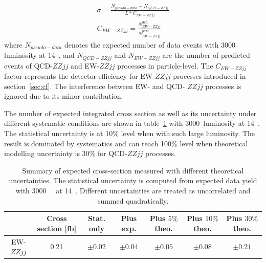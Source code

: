 \begin{equation}
\begin{split}
  \sigma = \frac{N_{pseudo-data} - N_{QCD-ZZjj}}{L*C_{EW-ZZjj}}\\
  C_{EW-ZZjj} = \frac{N_{EW-ZZjj}^{det.}}{N_{EW-ZZjj}^{part.}}
\end{split}
\end{equation}
where $N_{pseudo-data}$ denotes the expected number of data events with 3000~\ifb~ luminosity at 14~\tev,
and $N_{QCD-ZZjj}$ and $N_{EW-ZZjj}$ are the number of predicted events of QCD-$ZZjj$ and EW-$ZZjj$ processes in particle-level.
The $C_{EW-ZZjj}$ factor represents the detector efficiency for EW-$ZZjj$ processes introduced in section~\ref{sec:cf}.
The interference between EW- and QCD- $ZZjj$ processes is ignored due to its minor contribution.

The number of expected integrated cross section as well as its uncertainty under different systematic conditions are shown in table~\ref{tab:xsec}
with 3000~\ifb luminosity at 14~\tev.
The statistical uncertainty is at 10\% level when with such large luminosity.
The result is dominated by systematics and can reach 100\% level when theoretical modelling uncertainty is 30\% for QCD-$ZZjj$ processes.
\begin{table}[htbp]
  \footnotesize
  \centering
  \begin{tabular}{c|c|c|c|c|c|c}
    \hline
     & Cross section [fb] & Stat. only & Plus exp. & Plus $5\%$ theo. & Plus $10\%$ theo. & Plus $30\%$ theo. \\
    \hline
    EW-$ZZjj$ & 0.21 & $\pm0.02$ & $\pm0.04$ & $\pm0.05$ & $\pm 0.08$ & $\pm 0.21$ \\
    \hline
  \end{tabular}
  \caption{
  Summary of expected cross-section measured with different theoretical uncertainties.
  The statistical uncertainty is computed from expected data yield with 3000~\ifb~ at 14~\tev.
  Different uncertainties are treated as uncorrelated and summed quadratically.
  }
  \label{tab:xsec}
\end{table}

